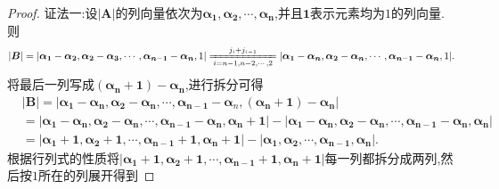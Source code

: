 \documentclass[../../main.tex]{subfiles}
\begin{document}
\begin{proof}
{\color{blue}证法一:}设\(|\boldsymbol{A}|\)的列向量依次为\(\boldsymbol{\alpha }_{\mathbf{1}},\boldsymbol{\alpha }_{\mathbf{2}},\cdots ,\boldsymbol{\alpha }_{\boldsymbol{n}}\),并且\(\mathbf{1}\)表示元素均为\(1\)的列向量.则
\begin{align*}
|\boldsymbol{B}|=|\boldsymbol{\alpha }_{\mathbf{1}}-\boldsymbol{\alpha }_{\mathbf{2}},\boldsymbol{\alpha }_{\mathbf{2}}-\boldsymbol{\alpha }_{\mathbf{3}},\cdots ,\boldsymbol{\alpha }_{\boldsymbol{n}-\mathbf{1}}-\boldsymbol{\alpha }_{\boldsymbol{n}},1|\xlongequal[i=n-1,n-2,\cdots ,2]{j_i+j_{i-1}}|\boldsymbol{\alpha }_{\mathbf{1}}-\boldsymbol{\alpha }_{\boldsymbol{n}},\boldsymbol{\alpha }_{\mathbf{2}}-\boldsymbol{\alpha }_{\boldsymbol{n}},\cdots ,\boldsymbol{\alpha }_{\boldsymbol{n}-\mathbf{1}}-\boldsymbol{\alpha }_{\boldsymbol{n}},1|.        
\end{align*}
将最后一列写成\((\boldsymbol{\alpha}_{\boldsymbol{n}} + \mathbf{1}) - \boldsymbol{\alpha}_{\boldsymbol{n}}\),进行拆分可得
\begin{align*}
&|\boldsymbol{B}| = |\boldsymbol{\alpha}_{\boldsymbol{1}} - \boldsymbol{\alpha}_{\boldsymbol{n}},\boldsymbol{\alpha}_{\boldsymbol{2}} - \boldsymbol{\alpha}_{\boldsymbol{n}},\cdots,\boldsymbol{\alpha}_{\boldsymbol{n - 1}} - \boldsymbol{\alpha}_n,(\boldsymbol{\alpha}_{\boldsymbol{n}} + \mathbf{1}) - \boldsymbol{\alpha}_{\boldsymbol{n}}|
\\
&= |\boldsymbol{\alpha}_{\boldsymbol{1}} - \boldsymbol{\alpha}_{\boldsymbol{n}},\boldsymbol{\alpha}_{\boldsymbol{2}} - \boldsymbol{\alpha}_{\boldsymbol{n}},\cdots,\boldsymbol{\alpha}_{\boldsymbol{n - 1}} - \boldsymbol{\alpha}_{\boldsymbol{n}},\boldsymbol{\alpha}_{\boldsymbol{n}} + \mathbf{1}| - |\boldsymbol{\alpha}_{\boldsymbol{1}} - \boldsymbol{\alpha}_{\boldsymbol{n}},\boldsymbol{\alpha}_{\boldsymbol{2}} - \boldsymbol{\alpha}_{\boldsymbol{n}},\cdots,\boldsymbol{\alpha}_{\boldsymbol{n - 1}} - \boldsymbol{\alpha}_{\boldsymbol{n}},\boldsymbol{\alpha}_{\boldsymbol{n}}|
\\
&= |\boldsymbol{\alpha}_{\boldsymbol{1}} + \mathbf{1},\boldsymbol{\alpha}_{\boldsymbol{2}} + \mathbf{1},\cdots,\boldsymbol{\alpha}_{\boldsymbol{n - 1}} + \mathbf{1},\boldsymbol{\alpha}_{\boldsymbol{n}} + \mathbf{1}| - |\boldsymbol{\alpha}_{\boldsymbol{1}},\boldsymbol{\alpha}_{\boldsymbol{2}},\cdots,\boldsymbol{\alpha}_{\boldsymbol{n-1}},\boldsymbol{\alpha}_{\boldsymbol{n}}|.
\end{align*}
根据行列式的性质将\(|\boldsymbol{\alpha}_{\boldsymbol{1}} + \mathbf{1},\boldsymbol{\alpha}_{\boldsymbol{2}} + \mathbf{1},\cdots,\boldsymbol{\alpha}_{\boldsymbol{n-1}} + \mathbf{1},\boldsymbol{\alpha}_{\boldsymbol{n}} + \mathbf{1}|\)每一列都拆分成两列,然后按\(1\)所在的列展开得到

\end{proof}
\end{document}
